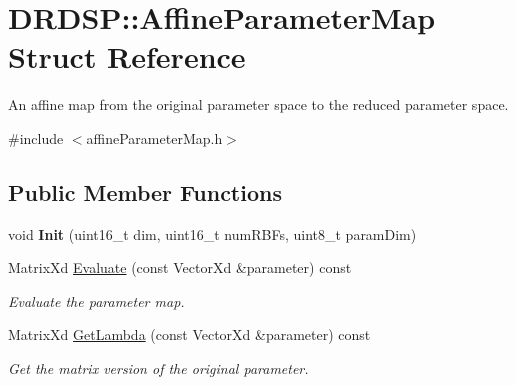 \hypertarget{struct_d_r_d_s_p_1_1_affine_parameter_map}{\section{D\-R\-D\-S\-P\-:\-:Affine\-Parameter\-Map Struct Reference}
\label{struct_d_r_d_s_p_1_1_affine_parameter_map}
}


An affine map from the original parameter space to the reduced parameter space.  




{\ttfamily \#include $<$affine\-Parameter\-Map.\-h$>$}

\subsection*{Public Member Functions}
\begin{DoxyCompactItemize}
\item 
\hypertarget{struct_d_r_d_s_p_1_1_affine_parameter_map_a56991113d3a808ed701b1d1e10ebb3e0}{void {\bfseries Init} (uint16\-\_\-t dim, uint16\-\_\-t num\-R\-B\-Fs, uint8\-\_\-t param\-Dim)}\label{struct_d_r_d_s_p_1_1_affine_parameter_map_a56991113d3a808ed701b1d1e10ebb3e0}

\item 
\hypertarget{struct_d_r_d_s_p_1_1_affine_parameter_map_a185c0b51a2ac97fadcfd137f8b35cd98}{Matrix\-Xd \hyperlink{struct_d_r_d_s_p_1_1_affine_parameter_map_a185c0b51a2ac97fadcfd137f8b35cd98}{Evaluate} (const Vector\-Xd \&parameter) const }\label{struct_d_r_d_s_p_1_1_affine_parameter_map_a185c0b51a2ac97fadcfd137f8b35cd98}

\begin{DoxyCompactList}\small\item\em Evaluate the parameter map. \end{DoxyCompactList}\item 
\hypertarget{struct_d_r_d_s_p_1_1_affine_parameter_map_ae983bda2073bac0d8e6aebcc34d51153}{Matrix\-Xd \hyperlink{struct_d_r_d_s_p_1_1_affine_parameter_map_ae983bda2073bac0d8e6aebcc34d51153}{Get\-Lambda} (const Vector\-Xd \&parameter) const }\label{struct_d_r_d_s_p_1_1_affine_parameter_map_ae983bda2073bac0d8e6aebcc34d51153}

\begin{DoxyCompactList}\small\item\em Get the matrix version of the original parameter. \end{DoxyCompactList}\end{DoxyCompactItemize}
